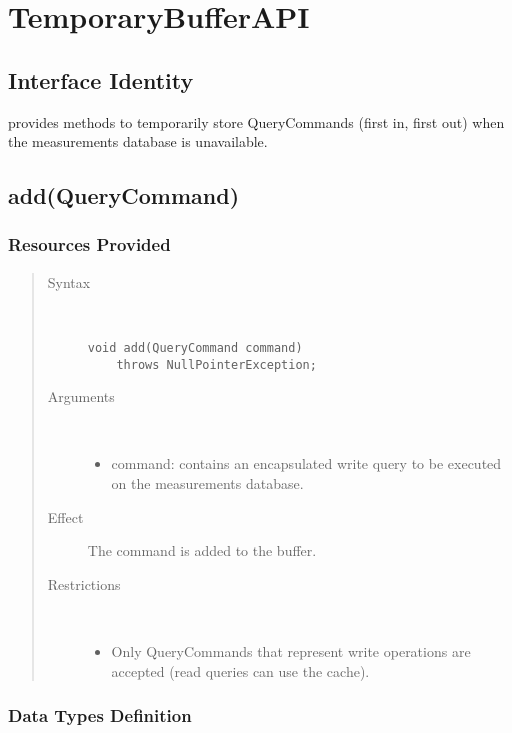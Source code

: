 \section{TemporaryBufferAPI}

\subsection{Interface Identity}

\npar {} provides methods to temporarily store 
QueryCommands (first in, first out) when the measurements database is
unavailable.

\subsection{add(QueryCommand)}

\subsubsection{Resources Provided}

\begin{quote}
	\begin{description}
		\item[Syntax] \ 
		\begin{verbatim}
void add(QueryCommand command) 
    throws NullPointerException;
		\end{verbatim}
		\item[Arguments] \
		\begin{itemize}
			\item command: contains an encapsulated write query to be executed on the
			measurements database.
		\end{itemize}
		\item[Effect] The command is added to the buffer. 
		\item[Restrictions] \ 
		\begin{itemize}
			\item Only QueryCommands that represent write operations are accepted (read
			queries can use the cache). 
		\end{itemize}
	\end{description} 
\end{quote}

\subsubsection{Data Types Definition}

